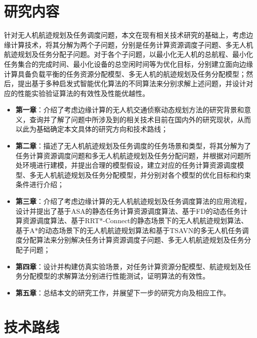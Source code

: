 \section{研究内容}

针对无人机航迹规划及任务调度问题，本文在现有相关技术研究的基础上，考虑边缘计算技术，将其分解为两个子问题，分别是任务计算资源调度子问题、多无人机航迹规划及任务分配子问题。对于各个子问题，以最小化无人机的总航程、最小化任务集合的完成时间、最小化设备的总空闲时间等为优化目标，分别建立面向边缘计算具备负载平衡的任务资源分配模型、多无人机的航迹规划及任务分配模型；然后，提出基于多种启发式智能优化算法的不同算法来分别求解上述问题，并设计对应的性能实验验证算法的有效性及性能优越性。

\begin{itemize}
    \item {\textbf{第一章}：介绍了考虑边缘计算的无人机交通侦察动态规划方法的研究背景和意义，查询并了解了问题中所涉及到的相关技术目前在国内外的研究现状，从而以此为基础确定本文具体的研究方向和技术路线；}

    \item {\textbf{第二章}：描述了无人机航迹规划及任务调度的任务场景和类型，将其分解为了任务计算资源调度问题和多无人机航迹规划及任务分配问题，并根据对问题所处环境进行建模，并提出合理的模型假设，建立对应的任务计算资源调度模型、多无人机航迹规划及任务分配模型，并分别对各个模型的优化目标和约束条件进行介绍；}

    \item {\textbf{第三章}：介绍了考虑边缘计算的无人机航迹规划及任务调度算法的应用流程，设计并提出了基于ASA的静态任务计算资源调度算法、基于FD的动态任务计算资源调度算法、基于RRT*-Connect的静态场景下的无人机航迹规划算法、基于A*的动态场景下的无人机航迹规划算法和基于TSAVN的多无人机任务调度分配算法来分别解决任务计算资源调度子问题、多无人机航迹规划及任务分配子问题；}

    \item {\textbf{第四章}：设计并构建仿真实验场景，对任务计算资源分配模型、航迹规划及任务分配模型的求解算法分别进行性能测试，证明算法的有效性。}

    \item {\textbf{第五章}：总结本文的研究工作，并展望下一步的研究方向及相应工作。}
\end{itemize}

\newpage

\section{技术路线}

